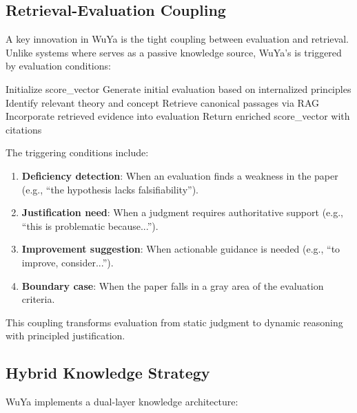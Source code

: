 \subsection{Retrieval-Evaluation Coupling}

A key innovation in WuYa is the tight coupling between evaluation and retrieval. Unlike systems where \rag{} serves as a passive knowledge source, WuYa's \rag{} is triggered by evaluation conditions:

\begin{algorithm}[t]
\caption{Retrieval-Evaluation Coupling}
\label{alg:rag-trigger}
\begin{algorithmic}
\STATE Initialize score\_vector
    \STATE Generate initial evaluation based on internalized principles
        \STATE Identify relevant theory and concept
        \STATE Retrieve canonical passages via RAG
        \STATE Incorporate retrieved evidence into evaluation
    \ENDIF
\ENDFOR
\STATE Return enriched score\_vector with citations
\end{algorithmic}
\end{algorithm}

The triggering conditions include:

\begin{enumerate}
    \item \textbf{Deficiency detection}: When an evaluation finds a weakness in the paper (e.g., ``the hypothesis lacks falsifiability'').
    \item \textbf{Justification need}: When a judgment requires authoritative support (e.g., ``this is problematic because...'').
    \item \textbf{Improvement suggestion}: When actionable guidance is needed (e.g., ``to improve, consider...'').
    \item \textbf{Boundary case}: When the paper falls in a gray area of the evaluation criteria.
\end{enumerate}

This coupling transforms evaluation from static judgment to dynamic reasoning with principled justification.

\subsection{Hybrid Knowledge Strategy}

WuYa implements a dual-layer knowledge architecture:

